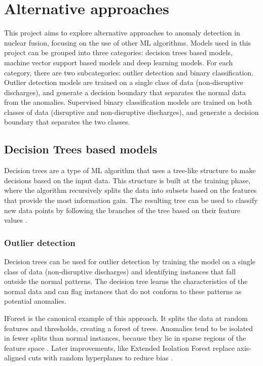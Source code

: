 \section{Alternative approaches}

This project aims to explore alternative approaches to anomaly detection in nuclear fusion, focusing on the use of other \ac{ML} algorithms. Models used in this project can be grouped into three categories: decision trees based models, machine vector support based models and deep learning models. For each category, there are two subcategories: outlier detection and binary classification. Outlier detection models are trained on a single class of data (non-disruptive discharges), and generate a decision boundary that separates the normal data from the anomalies. Supervised binary classification models are trained on both classes of data (disruptive and non-disruptive discharges), and generate a decision boundary that separates the two classes.

\subsection{Decision Trees based models}

Decision trees are a type of \ac{ML} algorithm that uses a tree-like structure to make decisions based on the input data. This structure is built at the training phase, where the algorithm recursively splits the data into subsets based on the features that provide the most information gain. The resulting tree can be used to classify new data points by following the branches of the tree based on their feature values \autocite{1522531}.

\subsubsection{Outlier detection}

Decision trees can be used for outlier detection by training the model on a single class of data (non-disruptive discharges) and identifying instances that fall outside the normal patterns. The decision tree learns the characteristics of the normal data and can flag instances that do not conform to these patterns as potential anomalies. 

\ac{IForest} is the canonical example of this approach. It splits the data at random features and thresholds, creating a forest of trees. Anomalies tend to be isolated in fewer splits than normal instances, because they lie in sparse regions of the feature space \autocite{inproceedings}. Later improvements, like Extended Isolation Forest replace axis-aligned cuts with random hyperplanes to reduce bias \autocite{haririExtendedIsolationForest2019}.

